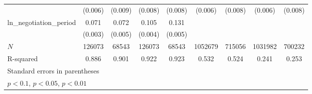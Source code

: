 {\begin{tabular}{l*{8}{c}}
            &     (0.006)         &     (0.009)         &     (0.008)         &     (0.008)         &     (0.006)         &     (0.008)         &     (0.006)         &     (0.008)         \\
\addlinespace
ln\_negotiation\_period&       0.071\sym{***}&       0.072\sym{***}&       0.105\sym{***}&       0.131\sym{***}&                     &                     &                     &                     \\
            &     (0.003)         &     (0.005)         &     (0.004)         &     (0.005)         &                     &                     &                     &                     \\
\midrule
\(N\)       &      126073         &       68543         &      126073         &       68543         &     1052679         &      715056         &     1031982         &      700232         \\
R-squared   &       0.886         &       0.901         &       0.922         &       0.923         &       0.532         &       0.524         &       0.241         &       0.253         \\
\bottomrule
\multicolumn{9}{l}{\footnotesize Standard errors in parentheses}\\
\multicolumn{9}{l}{\footnotesize \sym{*} \(p<0.1\), \sym{**} \(p<0.05\), \sym{***} \(p<0.01\)}\\
\end{tabular}
}
